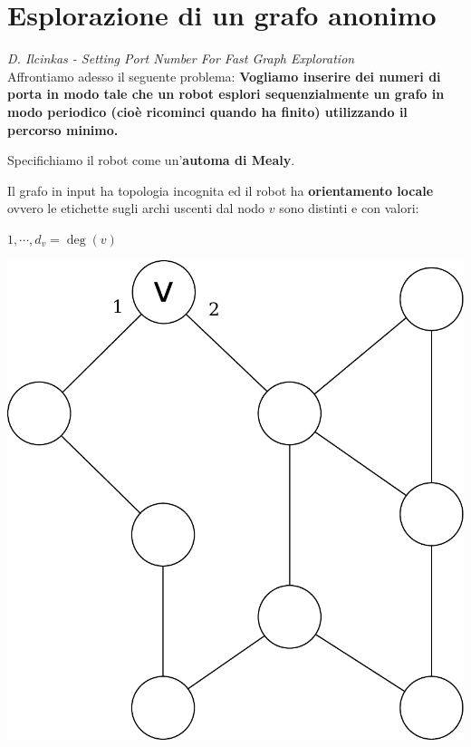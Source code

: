 \chapter{Esplorazione di un grafo anonimo}

\emph{D. Ilcinkas -
    Setting Port Number For Fast Graph Exploration}\\

Affrontiamo adesso il seguente problema: \textbf{Vogliamo inserire dei numeri di
    porta in modo tale che un robot esplori sequenzialmente un grafo in modo
    periodico (cioè ricominci quando ha finito) utilizzando il percorso minimo.}


Specifichiamo il robot come un'\textbf{automa di Mealy}.

Il grafo in input ha topologia incognita ed il robot ha \textbf{orientamento
    locale} ovvero le etichette sugli archi uscenti dal nodo $v$ sono distinti e con
valori:
\begin{center}
    $1, \cdots, d_v = \deg (v)$\end{center}
\begin{center}
    \includegraphics[scale=0.3]{capitoli/esplorazione-grafo-anonimo/imgs/n_25}
\end{center}

